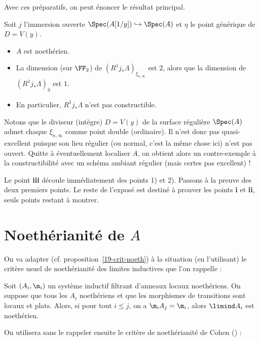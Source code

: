 \documentclass[10pt]{../fichiers-configuration-latex/smfart}
\begin{document}
Avec ces préparatifs, on peut énoncer le résultat principal.

\begin{proposition}\label{19-prop-cexgabber} Soit $j$  l'immersion ouverte
$\Spec(A[1/y])\hookrightarrow \Spec(A)$ et $\eta$ le point générique de $D=V(y)$.  \begin{itemize}
\item $A$ est noethérien.  \item La dimension (sur $\FF_2$) de
$(R^1j_*\Lambda)_{\overline{\xi_{n,\infty}}}$ est $2$, alors que la dimension de
$(R^1j_*\Lambda)_{\bar\eta}$  est $1$.  \item En particulier, $R^1j_*\Lambda$ n'est pas
constructible.  \end{itemize} \end{proposition}

\begin{remarque}\label{19-rem-cexgabber}Notons que le diviseur (intègre)  $D=V(y)$ de la surface
régulière $\Spec(A)$ admet chaque $\xi_{n,\infty}$ comme point double (ordinaire). Il n'est donc pas
quasi-excellent puisque son lieu régulier (ou normal, c'est la même chose ici) n'est pas ouvert.
Quitte à éventuellement localiser $A$, on obtient alors un contre-exemple à la constructibilité avec
un schéma ambiant régulier (mais certes pas excellent) ! \end{remarque}

Le point \textbf{iii} découle immédiatement des points 1) et 2). Passons à la preuve des deux
premiers points.  Le reste de l'exposé est destiné à prouver les points \textbf{i} et \textbf{ii},
seuls points restant à montrer.

\section{Noethérianité de $A$} On va adapter (cf. proposition~\ref{19-crit-noeth}) à la situation
(en l'utilisant)  le critère usuel de noethérianité des limites inductives  que l'on rappelle :

\begin{theoreme}\label{19-ega-noeth}Soit $(A_i,\m_i)$ un système inductif
filtrant d'anneaux locaux noethériens. On suppose que tous les $A_i$ noethériens et que les
morphismes de transitions sont locaux et plats. Alors, si pour tout $i\leq j$, on a $\m_iA_j=\m_i$,
alors $\limind A_i$ est noethérien.\end{theoreme}

On utilisera sans le rappeler ensuite le critère de noethérianité de Cohen (\cite[3.4]{Nag62}) :
\end{document}
